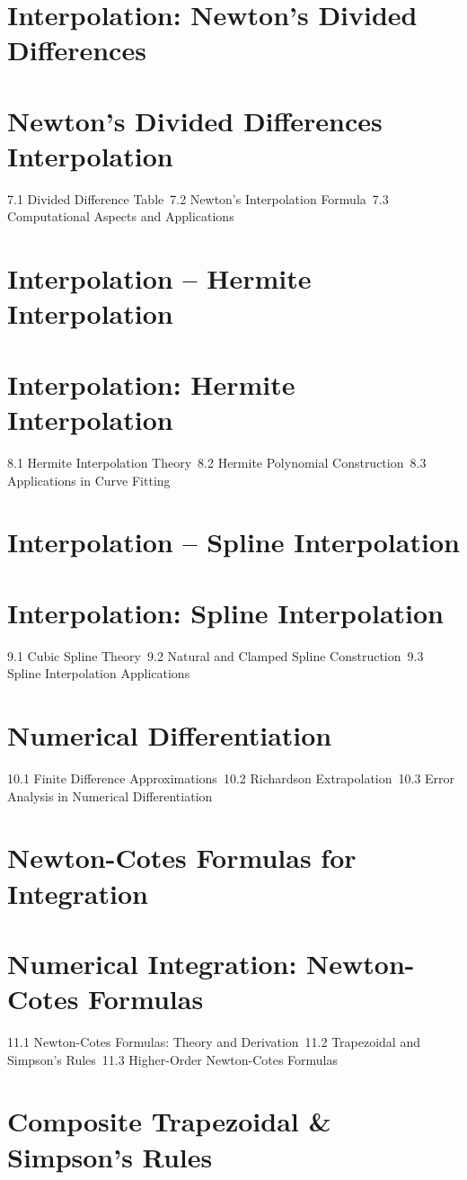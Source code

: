 \section{Interpolation: Newton's Divided Differences}
\section{Newton's Divided Differences Interpolation}
7.1 Divided Difference Table\
7.2 Newton's Interpolation Formula\
7.3 Computational Aspects and Applications\
\section{Interpolation – Hermite Interpolation}
\section{Interpolation: Hermite Interpolation}
8.1 Hermite Interpolation Theory\
8.2 Hermite Polynomial Construction\
8.3 Applications in Curve Fitting\
\section{Interpolation – Spline Interpolation}
\section{Interpolation: Spline Interpolation}
9.1 Cubic Spline Theory\
9.2 Natural and Clamped Spline Construction\
9.3 Spline Interpolation Applications\
\section{Numerical Differentiation}
10.1 Finite Difference Approximations\
10.2 Richardson Extrapolation\
10.3 Error Analysis in Numerical Differentiation\
\section{Newton-Cotes Formulas for Integration}
\section{Numerical Integration: Newton-Cotes Formulas}
11.1 Newton-Cotes Formulas: Theory and Derivation\
11.2 Trapezoidal and Simpson's Rules\
11.3 Higher-Order Newton-Cotes Formulas\
\section{Composite Trapezoidal \& Simpson's Rules}
